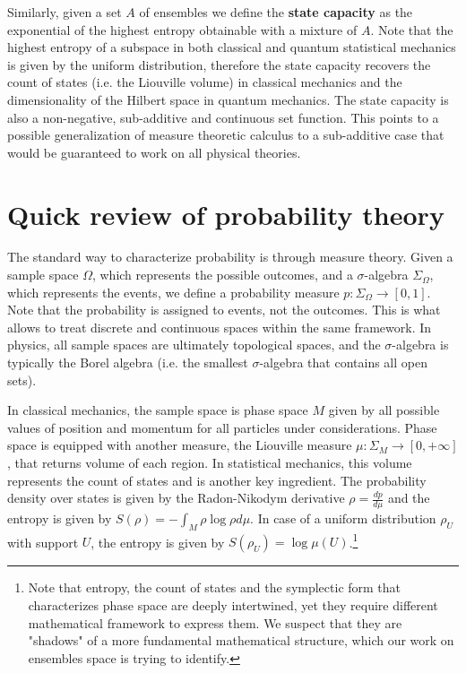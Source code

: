 \documentclass[10pt,twocolumn, nofootinbib]{revtex4-2}
\begin{document}
Similarly, given a set $A$ of ensembles we define the \textbf{state capacity} as the exponential of the highest entropy obtainable with a mixture of $A$. Note that the highest entropy of a subspace in both classical and quantum statistical mechanics is given by the uniform distribution, therefore the state capacity recovers the count of states (i.e. the Liouville volume) in classical mechanics and the dimensionality of the Hilbert space in quantum mechanics. The state capacity is also a non-negative, sub-additive and continuous set function. This points to a possible generalization of measure theoretic calculus to a sub-additive case that would be guaranteed to work on all physical theories.

\section{Quick review of probability theory}

The standard way to characterize probability is through measure theory. Given a sample space $\Omega$, which represents the possible outcomes, and a $\sigma$-algebra $\Sigma_{\Omega}$, which represents the events, we define a probability measure $p : \Sigma_{\Omega} \to [0,1]$. Note that the probability is assigned to events, not the outcomes. This is what allows to treat discrete and continuous spaces within the same framework. In physics, all sample spaces are ultimately topological spaces, and the $\sigma$-algebra is typically the Borel algebra (i.e. the smallest $\sigma$-algebra that contains all open sets).

In classical mechanics, the sample space is phase space $M$ given by all possible values of position and momentum for all particles under considerations. Phase space is equipped with another measure, the Liouville measure $\mu : \Sigma_M \to [0, +\infty]$, that returns volume of each region. In statistical mechanics, this volume represents the count of states and is another key ingredient. The probability density over states is given by the Radon-Nikodym derivative $\rho = \frac{dp}{d\mu}$ and the entropy is given by $S(\rho) = - \int_M \rho \log \rho d\mu$. In case of a uniform distribution $\rho_U$ with support $U$, the entropy is given by $S(\rho_U) = \log \mu(U)$.\footnote{Note that entropy, the count of states and the symplectic form that characterizes phase space are deeply intertwined, yet they require different mathematical framework to express them. We suspect that they are "shadows" of a more fundamental mathematical structure, which our work on ensembles space is trying to identify.}
\end{document}
